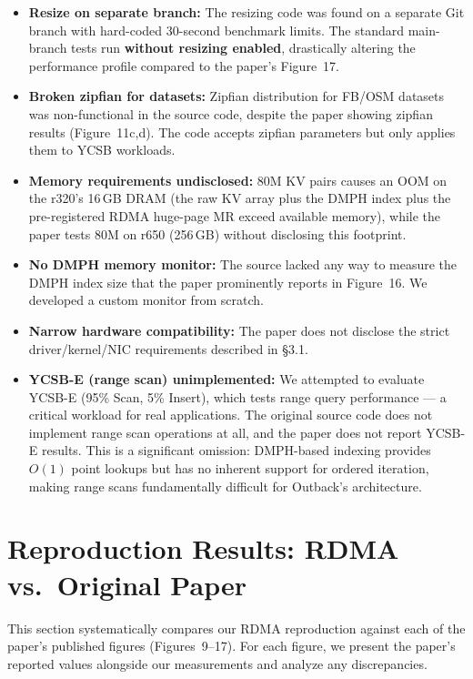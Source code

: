 \documentclass[conference]{IEEEtran}
\begin{document}
\begin{itemize}[nosep]
  \item \textbf{Resize on separate branch:} The resizing code was found on a separate Git branch with hard-coded 30-second benchmark limits. The standard main-branch tests run \textbf{without resizing enabled}, drastically altering the performance profile compared to the paper's Figure~17.
  \item \textbf{Broken zipfian for datasets:} Zipfian distribution for FB/OSM datasets was non-functional in the source code, despite the paper showing zipfian results (Figure~11c,d). The code accepts zipfian parameters but only applies them to YCSB workloads.
  \item \textbf{Memory requirements undisclosed:} 80M KV pairs causes an OOM on the r320's 16\,GB DRAM (the raw KV array plus the DMPH index plus the pre-registered RDMA huge-page MR exceed available memory), while the paper tests 80M on r650 (256\,GB) without disclosing this footprint.
  \item \textbf{No DMPH memory monitor:} The source lacked any way to measure the DMPH index size that the paper prominently reports in Figure~16. We developed a custom monitor from scratch.
  \item \textbf{Narrow hardware compatibility:} The paper does not disclose the strict driver/kernel/NIC requirements described in \S3.1.
  \item \textbf{YCSB-E (range scan) unimplemented:} We attempted to evaluate YCSB-E (95\% Scan, 5\% Insert), which tests range query performance --- a critical workload for real applications. The original source code does not implement range scan operations at all, and the paper does not report YCSB-E results. This is a significant omission: DMPH-based indexing provides $O(1)$ point lookups but has no inherent support for ordered iteration, making range scans fundamentally difficult for Outback's architecture.
\end{itemize}

\section{Reproduction Results: RDMA vs.\ Original Paper}

This section systematically compares our RDMA reproduction against each of the paper's published figures (Figures~9--17). For each figure, we present the paper's reported values alongside our measurements and analyze any discrepancies.
\end{document}
